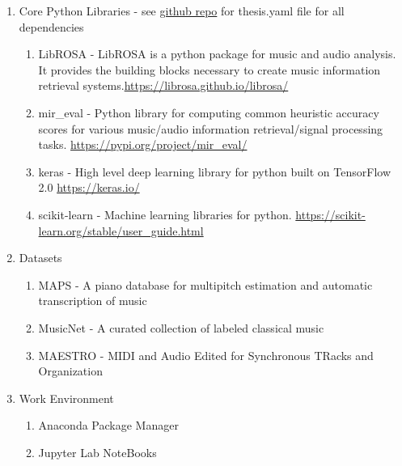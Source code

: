 \begin{enumerate}
      \item Core Python Libraries - see
            \href{https://github.com/OliverIgnetik/engn4200_thesis}{github repo}
            for thesis.yaml file for all dependencies
            \begin{enumerate}
                  \item LibROSA - LibROSA is a python package for music and audio analysis. It provides the building blocks necessary to create music information retrieval systems.\newline \url{https://librosa.github.io/librosa/}
                  \item mir\_eval -  Python library for computing common heuristic accuracy scores for various music/audio information retrieval/signal processing tasks. \newline \url{https://pypi.org/project/mir_eval/}
                  \item keras - High level deep learning library for python built on TensorFlow 2.0 \newline \url{https://keras.io/}
                  \item scikit-learn -  Machine learning libraries for python. \newline \url{https://scikit-learn.org/stable/user_guide.html}
            \end{enumerate}
      \item Datasets
            \begin{enumerate}
                  \item MAPS - A piano database for multipitch estimation and automatic
                        transcription of music \cite{MAPS:Emiya}
                  \item MusicNet - A curated collection of labeled classical music \cite{thickstun2018invariances}
                  \item MAESTRO - MIDI and Audio Edited for Synchronous TRacks and
                        Organization \cite{hawthorne2018enabling}
            \end{enumerate}

      \item Work Environment
            \begin{enumerate}
                  \item Anaconda Package Manager
                  \item Jupyter Lab NoteBooks
            \end{enumerate}
\end{enumerate}
